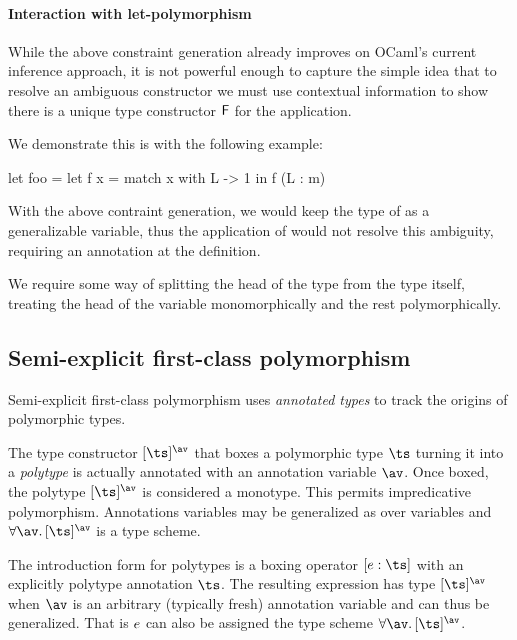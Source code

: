 \documentclass[acmsmall,screen,nonacm]{acmart}
\begin{document}
\paragraph{Interaction with let-polymorphism}


While the above constraint generation already improves on
OCaml's current inference approach, it is not powerful enough to capture the
simple idea that to resolve an ambiguous constructor we must use contextual
information to show there is a unique type constructor $\mathsf{F}$ for the
application.

We demonstrate this is with the following example:
\begin{program}
let foo =
  let f x = match x with L -> 1 in
  f (L : m)
\end{program}
With the above contraint generation, we would keep the type of 
as a generalizable variable, thus the application of  would not
resolve this ambiguity, requiring an annotation at the definition.

We require some way of splitting the head of the type from the type itself,
treating the head of the variable monomorphically and the rest
polymorphically.


\subsection{Semi-explicit first-class polymorphism}

\label {sec/constraints/polytypes}


Semi-explicit first-class polymorphism \citep{Garrigue-Remy/poly-ml} uses
\textit{annotated types} to track the origins of polymorphic types.

The type constructor $\tpoly \ts \av$ that boxes a polymorphic type
$\ts$ turning it into a \textit{polytype} is actually annotated with
an annotation variable $\av$.  Once boxed, the polytype $\tpoly
\ts \av$ is considered a monotype.  This permits impredicative
polymorphism. Annotations variables may be generalized as over
variables and $\all \av \tpoly \ts \av$ is a type scheme.

The introduction form for polytypes is a boxing operator $\epoly
\e \ts$ with an explicitly polytype annotation $\ts$. The resulting expression
has type $\tpoly \ts \av$ when $\av$ is an arbitrary (typically fresh)
annotation variable and can thus be generalized. That is $e$ can also be
assigned the type scheme $\all \av \tpoly \ts \av$.
\end{document}
